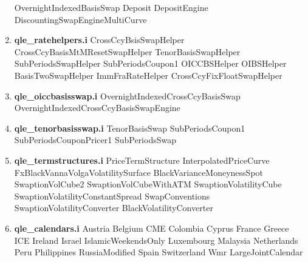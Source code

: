 \documentclass[10pt]{article}
\begin{document}
\begin{multicols}{2}
\begin{enumerate}
                \subitem OvernightIndexedBasisSwap
                \subitem Deposit
                \subitem DepositEngine
                \subitem DiscountingSwapEngineMultiCurve
        \item \textbf{qle\_ratehelpers.i}
                \subitem CrossCcyBsisSwapHelper
                \subitem CrossCcyBasisMtMResetSwapHelper
                \subitem TenorBasisSwapHelper
                \subitem SubPeriodsSwapHelper
                \subitem SubPeriodsCoupon1
                \subitem OICCBSHelper
                \subitem OIBSHelper
                \subitem BasisTwoSwapHelper
                \subitem ImmFraRateHelper
                \subitem CrossCcyFixFloatSwapHelper
        \item \textbf{qle\_oiccbasisswap.i}
                \subitem OvernightIndexedCrossCcyBasisSwap
                \subitem OvernightIndexedCrossCcyBasisSwapEngine
        \item \textbf{qle\_tenorbasisswap.i}
                \subitem TenorBasisSwap
                \subitem SubPeriodsCoupon1
                \subitem SubPeriodsCouponPricer1
                \subitem SubPeriodsSwap
        \item \textbf{qle\_termstructures.i}
                \subitem PriceTermStructure
                \subitem InterpolatedPriceCurve
                \subitem FxBlackVannaVolgaVolatilitySurface
                \subitem BlackVarianceMoneynessSpot
                \subitem SwaptionVolCube2
                \subitem SwaptionVolCubeWithATM
                \subitem SwaptionVolatilityCube
                \subitem SwaptionVolatilityConstantSpread
                \subitem SwapConventions
                \subitem SwaptionVolatilityConverter
                \subitem BlackVolatilityConverter    
        \item \textbf{qle\_calendars.i}
                \subitem Austria
                \subitem Belgium
                \subitem CME
                \subitem Colombia
                \subitem Cyprus
                \subitem France
                \subitem Greece
                \subitem ICE
                \subitem Ireland
                \subitem Israel
                \subitem IslamicWeekendsOnly
                \subitem Luxembourg
                \subitem Malaysia
                \subitem Netherlands
                \subitem Peru
                \subitem Philippines
                \subitem RussiaModified
                \subitem Spain
                \subitem Switzerland
                \subitem Wmr
                \subitem LargeJointCalendar

\end{enumerate}
\end{multicols}
\end{document}
